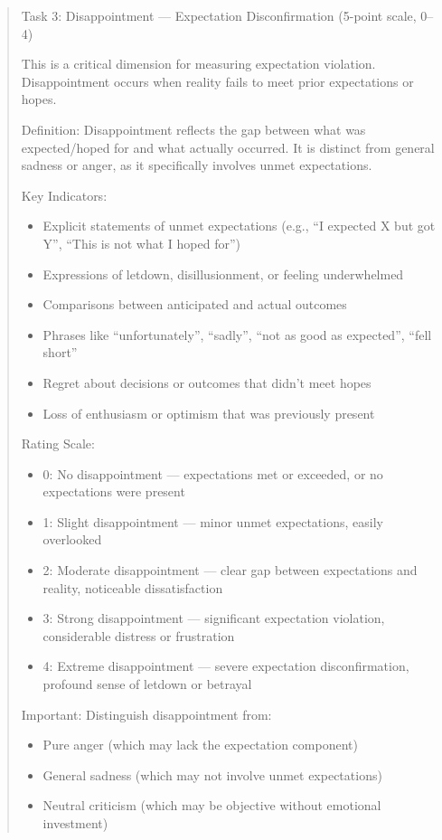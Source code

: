 \documentclass[
    type = master, %
    degree = professional,        %
    decl-page,  %
    twoside,                %
    fontset = fandol %
  ]{njuthesis}
\begin{document}
\begin{quote}
\medskip
Task 3: Disappointment --- Expectation Disconfirmation (5-point scale, 0--4)

This is a critical dimension for measuring expectation violation.
Disappointment occurs when reality fails to meet prior expectations or hopes.

Definition: Disappointment reflects the gap between what was expected/hoped for
and what actually occurred. It is distinct from general sadness or anger,
as it specifically involves unmet expectations.

Key Indicators:
\begin{itemize}
  \item Explicit statements of unmet expectations
        (e.g., ``I expected X but got Y'', ``This is not what I hoped for'')
  \item Expressions of letdown, disillusionment, or feeling underwhelmed
  \item Comparisons between anticipated and actual outcomes
  \item Phrases like ``unfortunately'', ``sadly'', ``not as good as expected'', ``fell short''
  \item Regret about decisions or outcomes that didn't meet hopes
  \item Loss of enthusiasm or optimism that was previously present
\end{itemize}

Rating Scale:
\begin{itemize}
  \item 0: No disappointment --- expectations met or exceeded, or no expectations were present
  \item 1: Slight disappointment --- minor unmet expectations, easily overlooked
  \item 2: Moderate disappointment --- clear gap between expectations and reality, noticeable dissatisfaction
  \item 3: Strong disappointment --- significant expectation violation, considerable distress or frustration
  \item 4: Extreme disappointment --- severe expectation disconfirmation, profound sense of letdown or betrayal
\end{itemize}

Important: Distinguish disappointment from:
\begin{itemize}
  \item Pure anger (which may lack the expectation component)
  \item General sadness (which may not involve unmet expectations)
  \item Neutral criticism (which may be objective without emotional investment)
\end{itemize}


\end{quote}
\end{document}
